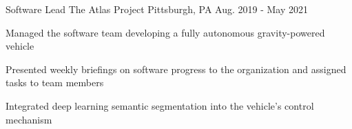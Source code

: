 

\begin{cventries}

  \cventry
    {Software Lead} %
    {The Atlas Project} %
    {Pittsburgh, PA} %
    {Aug. 2019 - May 2021} %
    {
      \begin{cvitems} %
		\item Managed the software team developing a fully autonomous gravity-powered vehicle
		\item Presented weekly briefings on software progress to the organization and assigned tasks to team members
		\item Integrated deep learning semantic segmentation into the vehicle's control mechanism
      \end{cvitems}
    }


\end{cventries}

